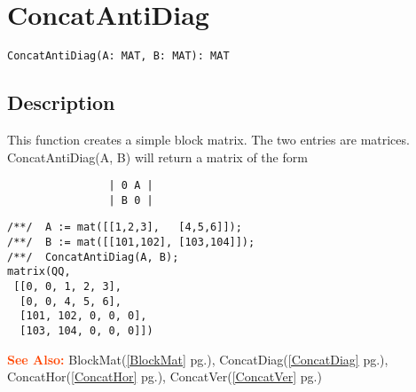 \documentclass[a4paper]{mybook}
\newenvironment{command}{}{} %
\newcommand\SeeAlso{\par\textcolor{OrangeRed}{\textbf{\large See Also: }}}
\begin{document}
\section{ConcatAntiDiag}
\label{ConcatAntiDiag}
\begin{command} %


\begin{Verbatim}[label=syntax, rulecolor=\color{MidnightBlue},
frame=single]
ConcatAntiDiag(A: MAT, B: MAT): MAT
\end{Verbatim}


\subsection*{Description}

This function creates a simple block matrix.  The two entries are
matrices.
ConcatAntiDiag(A, B) will return a matrix of the form
\begin{verbatim}
                | 0 A |
                | B 0 |
\end{verbatim}
\begin{Verbatim}[label=example, rulecolor=\color{PineGreen}, frame=single]
/**/  A := mat([[1,2,3],   [4,5,6]]);
/**/  B := mat([[101,102], [103,104]]);
/**/  ConcatAntiDiag(A, B);
matrix(QQ,
 [[0, 0, 1, 2, 3],
  [0, 0, 4, 5, 6],
  [101, 102, 0, 0, 0],
  [103, 104, 0, 0, 0]])
\end{Verbatim}


\SeeAlso %
  BlockMat(\ref{BlockMat} pg.\pageref{BlockMat}), 
    ConcatDiag(\ref{ConcatDiag} pg.\pageref{ConcatDiag}), 
    ConcatHor(\ref{ConcatHor} pg.\pageref{ConcatHor}), 
    ConcatVer(\ref{ConcatVer} pg.\pageref{ConcatVer})
\end{command} %
\end{document}
